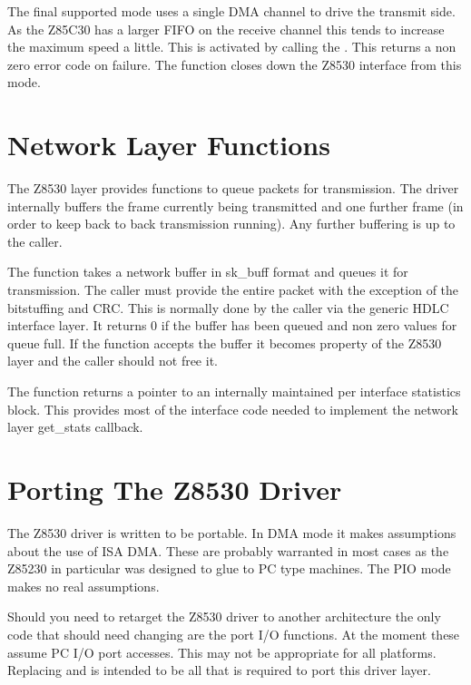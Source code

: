 \documentclass[a4paper,8pt,english]{sphinxmanual}
\begin{document}
The final supported mode uses a single DMA channel to drive the transmit
side. As the Z85C30 has a larger FIFO on the receive channel this tends
to increase the maximum speed a little. This is activated by calling the
. This returns a non zero error code on failure. The
{\hyperref[networking/z8530book:c.z8530_sync_txdma_close]{\emph{}}} function closes down the Z8530
interface from this mode.


\section{Network Layer Functions}
\label{networking/z8530book:network-layer-functions}
The Z8530 layer provides functions to queue packets for transmission.
The driver internally buffers the frame currently being transmitted and
one further frame (in order to keep back to back transmission running).
Any further buffering is up to the caller.

The function {\hyperref[networking/z8530book:c.z8530_queue_xmit]{\emph{}}} takes a network buffer
in sk\_buff format and queues it for transmission. The caller must
provide the entire packet with the exception of the bitstuffing and CRC.
This is normally done by the caller via the generic HDLC interface
layer. It returns 0 if the buffer has been queued and non zero values
for queue full. If the function accepts the buffer it becomes property
of the Z8530 layer and the caller should not free it.

The function  returns a pointer to an
internally maintained per interface statistics block. This provides most
of the interface code needed to implement the network layer get\_stats
callback.


\section{Porting The Z8530 Driver}
\label{networking/z8530book:porting-the-z8530-driver}
The Z8530 driver is written to be portable. In DMA mode it makes
assumptions about the use of ISA DMA. These are probably warranted in
most cases as the Z85230 in particular was designed to glue to PC type
machines. The PIO mode makes no real assumptions.

Should you need to retarget the Z8530 driver to another architecture the
only code that should need changing are the port I/O functions. At the
moment these assume PC I/O port accesses. This may not be appropriate
for all platforms. Replacing {\hyperref[networking/z8530book:c.z8530_read_port]{\emph{}}} and
 is intended to be all that is required to port
this driver layer.
\end{document}
